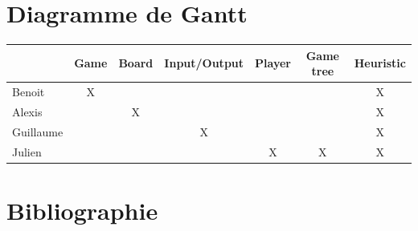 \documentclass[10pt,a4paper]{article}
\begin{document}
\newpage
\section{Diagramme de Gantt}
\begin{center}
  \begin{tabular}{| l | c | c | c | c | c | c |}
    \hline
              & Game & Board & Input/Output & Player & Game tree & Heuristic \\ \hline
    Benoit    &  X   &       &              &        &           &     X     \\ \hline
    Alexis    &      &   X   &              &        &           &     X     \\ \hline
    Guillaume &	     &       &      X       &        &           &     X     \\ \hline
    Julien    &      &       &              &   X    &    X      &     X     \\ \hline
  \end{tabular}
\end{center}

\section{Bibliographie}
\end{document}
